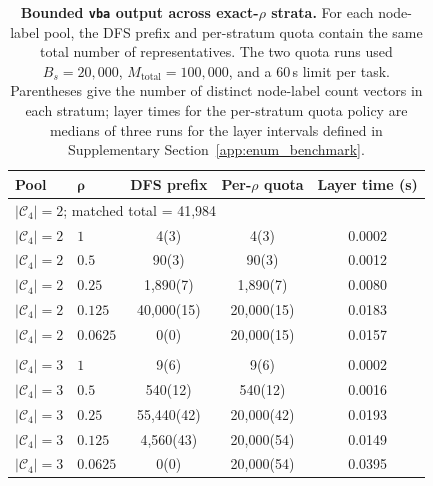 \documentclass[a5paper, 10pt]{article}
\begin{document}
\begin{table}[H]
\centering
\scriptsize
\setlength{\tabcolsep}{2.5mm}
\renewcommand{\arraystretch}{1.2}
\caption{\textbf{Bounded \texttt{vba} output across exact-$\rho$ strata.} For each node-label pool, the DFS prefix and per-stratum quota contain the same total number of representatives. The two quota runs used $B_s=20{,}000$, $M_{\mathrm{total}}=100{,}000$, and a 60\,s limit per task. Parentheses give the number of distinct node-label count vectors in each stratum; layer times for the per-stratum quota policy are medians of three runs for the layer intervals defined in Supplementary Section~\ref{app:enum_benchmark}.}
\label{tab:vba_bounded}
\begin{tabular}{llccc}
\toprule
\textbf{Pool} & $\boldsymbol{\rho}$ & \textbf{DFS prefix} & \textbf{Per-$\rho$ quota} & \textbf{Layer time (s)} \\
\midrule
\multicolumn{5}{l}{$|\mathcal{C}_4|=2$; matched total = 41,984} \\
$|\mathcal C_4|=2$ & $1$ & 4\;(3) & 4\;(3) & 0.0002 \\
$|\mathcal C_4|=2$ & $0.5$ & 90\;(3) & 90\;(3) & 0.0012 \\
$|\mathcal C_4|=2$ & $0.25$ & 1,890\;(7) & 1,890\;(7) & 0.0080 \\
$|\mathcal C_4|=2$ & $0.125$ & 40,000\;(15) & 20,000\;(15) & 0.0183 \\
$|\mathcal C_4|=2$ & $0.0625$ & 0\;(0) & 20,000\;(15) & 0.0157 \\
\addlinespace
\multicolumn{5}{l}{$|\mathcal{C}_4|=3$; matched total = 60,549} \\
$|\mathcal C_4|=3$ & $1$ & 9\;(6) & 9\;(6) & 0.0002 \\
$|\mathcal C_4|=3$ & $0.5$ & 540\;(12) & 540\;(12) & 0.0016 \\
$|\mathcal C_4|=3$ & $0.25$ & 55,440\;(42) & 20,000\;(42) & 0.0193 \\
$|\mathcal C_4|=3$ & $0.125$ & 4,560\;(43) & 20,000\;(54) & 0.0149 \\
$|\mathcal C_4|=3$ & $0.0625$ & 0\;(0) & 20,000\;(54) & 0.0395 \\
\bottomrule
\end{tabular}%
\end{table}
\end{document}
